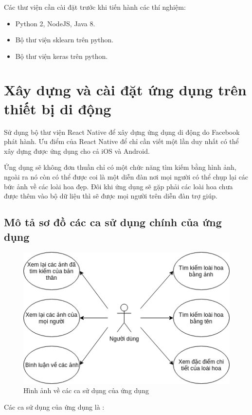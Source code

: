 \documentclass[12pt]{report}
\begin{document}
				
		Các thư viện cần cài đặt trước khi tiến hành các thí nghiệm:
				
		\begin{itemize}
			\item Python 2, NodeJS, Java 8.
			\item Bộ thư viện sklearn trên python.
			\item Bộ thư viện keras trên python.
		\end{itemize}
						
		\section{Xây dựng và cài đặt ứng dụng trên thiết bị di động}
		Sử dụng bộ thư viện React Native để xây dựng ứng dụng di động do Facebook phát hành. 
		Ưu điểm của React Native để chỉ cần viết một lần duy nhất có thể xây dựng được ứng dụng cho cả iOS và Android.
		
		Ứng dụng sẽ không đơn thuần chỉ có một chức năng tìm kiếm bằng hình ảnh, ngoài ra nó còn có thể được coi là một diễn đàn
		nơi mọi người có thể chụp lại các bức ảnh về các loài hoa đẹp. Đôi khi ứng dụng sẽ gặp phải các loài hoa chưa được thêm vào bộ dữ liệu thì sẽ được mọi người trên diễn đàn trợ giúp.

		\subsection{Mô tả sơ đồ các ca sử dụng chính của ứng dụng}
						
		\begin{figure}[h]
			\centering
			\includegraphics[scale=1]{usecase}
			\caption{Hình ảnh về các ca sử dụng của ứng dụng}
			\label{fig:usecase}
		\end{figure}
		Các ca sử dụng của ứng dụng là :
				
\end{document}
